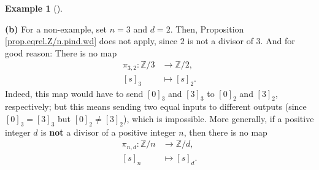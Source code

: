 \documentclass[numbers=enddot,12pt,final,onecolumn,notitlepage]{scrartcl}%
\numberwithin{exer}{subsection}
\theoremstyle{definition}
\newtheorem{exam}[theo]{Example}
\newenvironment{example}[1][]
{\begin{exam}[#1]\begin{leftbar}}
{\end{leftbar}\end{exam}}
\begin{document}
\begin{example}
\textbf{(b)} For a non-example, set $n=3$ and $d=2$. Then, Proposition
\ref{prop.eqrel.Z/n.pind.wd} does not apply, since $2$ is not a divisor of
$3$. And for good reason: There is no map%
\begin{align*}
\pi_{3,2}:\mathbb{Z}/3  &  \rightarrow\mathbb{Z}/2,\\
\left[  s\right]  _{3}  &  \mapsto\left[  s\right]  _{2}.
\end{align*}
Indeed, this map would have to send $\left[  0\right]  _{3}$ and $\left[
3\right]  _{3}$ to $\left[  0\right]  _{2}$ and $\left[  3\right]  _{2}$,
respectively; but this means sending two equal inputs to different outputs
(since $\left[  0\right]  _{3}=\left[  3\right]  _{3}$ but $\left[  0\right]
_{2}\neq\left[  3\right]  _{2}$), which is impossible. More generally, if a
positive integer $d$ is \textbf{not} a divisor of a positive integer $n$, then
there is no map%
\begin{align*}
\pi_{n,d}:\mathbb{Z}/n  &  \rightarrow\mathbb{Z}/d,\\
\left[  s\right]  _{n}  &  \mapsto\left[  s\right]  _{d}.
\end{align*}

\end{example}
\end{document}

